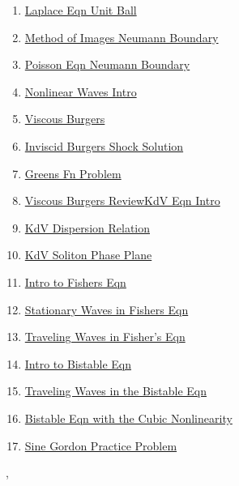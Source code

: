 \documentclass[11pt]{article}
\renewcommand{\today}{\shortmonthname[\the\month] \the \day,  \the\year}
\begin{document}
\begin{multicols}{2}
\begin{enumerate}
		\item  \href{https://mp.weixin.qq.com/s/nbHwJGAm0Vx8Gyqtz7ceSQ}{Laplace Eqn  Unit Ball}	%
		\item  \href{https://mp.weixin.qq.com/s/ue16KNM9QnoRyk-qdtkxDA}{Method of Images Neumann Boundary}	%
		\item  \href{https://mp.weixin.qq.com/s/XRzCQAlY2xqyg0JzILdS9g}{Poisson Eqn  Neumann Boundary}	%
		\item  \href{https://mp.weixin.qq.com/s/z84qTZ44ThgA3mSPrvaUOA}{Nonlinear Waves Intro}	%
		\item  \href{https://mp.weixin.qq.com/s/NGx1MVnj3VUupT4sk0Ev0g}{Viscous Burgers}	%
		\item  \href{https://mp.weixin.qq.com/s/8ELz33l5Y-YVX6TFN85XhA}{Inviscid Burgers Shock Solution}	%
		\item  \href{https://mp.weixin.qq.com/s/dkxX60lw6QHw5zexeO2Vdg}{Greens Fn Problem}	%
		\item  \href{https://mp.weixin.qq.com/s/oUzd0nGiVFhVKAvuugI9Pg}{Viscous Burgers ReviewKdV Eqn Intro}	%
		\item  \href{https://mp.weixin.qq.com/s/rzhnHXJDEH3G0BIpYEnxyQ}{KdV Dispersion Relation}	%
		\item  \href{https://mp.weixin.qq.com/s/YJg-19AoM4qeKILx4wzzqA}{KdV Soliton Phase Plane}	%
		\item  \href{https://mp.weixin.qq.com/s/fXSNLIQfBtg3Ww96X8Y70A}{Intro to Fishers Eqn}	%
		\item  \href{https://mp.weixin.qq.com/s/R19HKbpXCboAkmFGVPe2nQ}{Stationary Waves in Fishers Eqn}	%
		\item  \href{https://mp.weixin.qq.com/s/bA97_JAhHasCeNhdjeZ2Tw}{Traveling Waves in Fisher's Eqn}	%
		\item  \href{https://mp.weixin.qq.com/s/i4n7iSR66GH9zCeg0vh7rw}{Intro to Bistable Eqn}	%
		\item  \href{https://mp.weixin.qq.com/s/FjCWVDIvYQGXe4U0nZgs6w}{Traveling Waves in the Bistable Eqn}	%
		\item  \href{https://mp.weixin.qq.com/s/ddx3ckqXDrSBRU5gXazkew}{Bistable Eqn with the Cubic Nonlinearity}	%
		\item  \href{https://mp.weixin.qq.com/s/IN3L1NSF8VnUepE7uWG0oA}{Sine Gordon Practice Problem}	%
	\end{enumerate}
\end{multicols}




%
\begin{flushright}
	\tiny \today 
\end{flushright}
\end{document}
